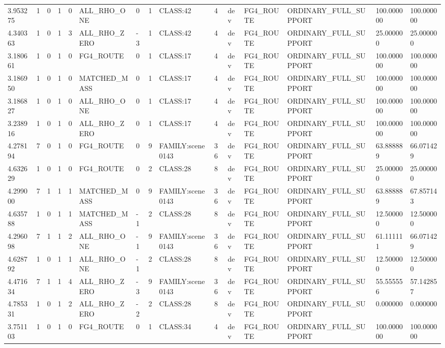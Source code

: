 \begin{tabular}{lllllllllllllll}
3.953275 & 1 & 0 & 1 & 0 & ALL\_RHO\_ONE & 0 & 1 & CLASS:42 & 4 & dev & FG4\_ROUTE & ORDINARY\_FULL\_SUPPORT & 100.000000 & 100.000000 \\
4.340363 & 1 & 0 & 1 & 3 & ALL\_RHO\_ZERO & -3 & 1 & CLASS:42 & 4 & dev & FG4\_ROUTE & ORDINARY\_FULL\_SUPPORT & 25.000000 & 25.000000 \\
3.180661 & 1 & 0 & 1 & 0 & FG4\_ROUTE & 0 & 1 & CLASS:17 & 4 & dev & FG4\_ROUTE & ORDINARY\_FULL\_SUPPORT & 100.000000 & 100.000000 \\
3.186950 & 1 & 0 & 1 & 0 & MATCHED\_MASS & 0 & 1 & CLASS:17 & 4 & dev & FG4\_ROUTE & ORDINARY\_FULL\_SUPPORT & 100.000000 & 100.000000 \\
3.186827 & 1 & 0 & 1 & 0 & ALL\_RHO\_ONE & 0 & 1 & CLASS:17 & 4 & dev & FG4\_ROUTE & ORDINARY\_FULL\_SUPPORT & 100.000000 & 100.000000 \\
3.238916 & 1 & 0 & 1 & 0 & ALL\_RHO\_ZERO & 0 & 1 & CLASS:17 & 4 & dev & FG4\_ROUTE & ORDINARY\_FULL\_SUPPORT & 100.000000 & 100.000000 \\
4.278194 & 7 & 0 & 1 & 0 & FG4\_ROUTE & 0 & 9 & FAMILY:scene0143 & 36 & dev & FG4\_ROUTE & ORDINARY\_FULL\_SUPPORT & 63.888889 & 66.071429 \\
4.632629 & 1 & 0 & 1 & 0 & FG4\_ROUTE & 0 & 2 & CLASS:28 & 8 & dev & FG4\_ROUTE & ORDINARY\_FULL\_SUPPORT & 25.000000 & 25.000000 \\
4.299000 & 7 & 1 & 1 & 1 & MATCHED\_MASS & 0 & 9 & FAMILY:scene0143 & 36 & dev & FG4\_ROUTE & ORDINARY\_FULL\_SUPPORT & 63.888889 & 67.857143 \\
4.635788 & 1 & 0 & 1 & 1 & MATCHED\_MASS & -1 & 2 & CLASS:28 & 8 & dev & FG4\_ROUTE & ORDINARY\_FULL\_SUPPORT & 12.500000 & 12.500000 \\
4.296098 & 7 & 1 & 1 & 2 & ALL\_RHO\_ONE & -1 & 9 & FAMILY:scene0143 & 36 & dev & FG4\_ROUTE & ORDINARY\_FULL\_SUPPORT & 61.111111 & 66.071429 \\
4.628792 & 1 & 0 & 1 & 1 & ALL\_RHO\_ONE & -1 & 2 & CLASS:28 & 8 & dev & FG4\_ROUTE & ORDINARY\_FULL\_SUPPORT & 12.500000 & 12.500000 \\
4.471634 & 7 & 1 & 1 & 4 & ALL\_RHO\_ZERO & -3 & 9 & FAMILY:scene0143 & 36 & dev & FG4\_ROUTE & ORDINARY\_FULL\_SUPPORT & 55.555556 & 57.142857 \\
4.785331 & 1 & 0 & 1 & 2 & ALL\_RHO\_ZERO & -2 & 2 & CLASS:28 & 8 & dev & FG4\_ROUTE & ORDINARY\_FULL\_SUPPORT & 0.000000 & 0.000000 \\
3.751103 & 1 & 0 & 1 & 0 & FG4\_ROUTE & 0 & 1 & CLASS:34 & 4 & dev & FG4\_ROUTE & ORDINARY\_FULL\_SUPPORT & 100.000000 & 100.000000 \\

\end{tabular}
